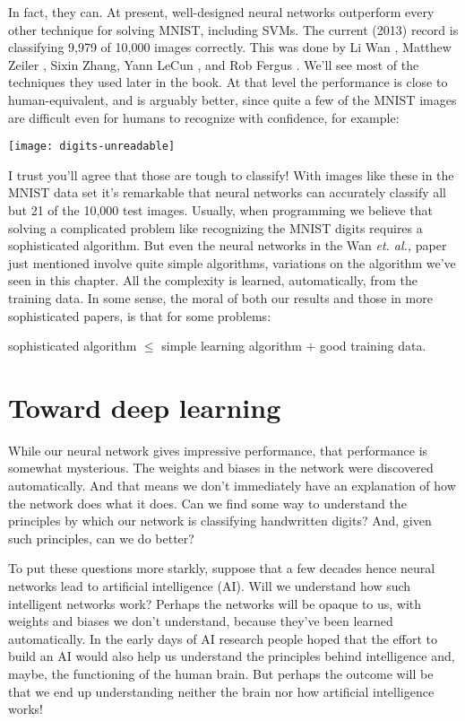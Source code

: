 In fact, they can. At present, well-designed neural networks outperform every other technique for solving MNIST, including SVMs. The current (2013) record is classifying 9,979 of 10,000 images correctly. This was done by Li Wan \cite{wanli2019}, Matthew Zeiler \cite{matthewzeiler2019}, Sixin Zhang, Yann LeCun \cite{yannlecun2019}, and Rob Fergus \cite{RobFergus2019}. We'll see most of the techniques they used later in the book. At that level the performance is close to human-equivalent, and is arguably better, since quite a few of the MNIST images are difficult even for humans to recognize with confidence, for example:

\begin{marginfigure}
\texttt{[image: digits-unreadable]}
\end{marginfigure}

I trust you'll agree that those are tough to classify! With images like these in the MNIST data set it's remarkable that neural networks can accurately classify all but 21 of the 10,000 test images. Usually, when programming we believe that solving a complicated problem like recognizing the MNIST digits requires a sophisticated algorithm. But even the neural networks in the Wan \textit{et. al.,} paper just mentioned involve quite simple algorithms, variations on the algorithm we've seen in this chapter. All the complexity is learned, automatically, from the training data. In some sense, the moral of both our results and those in more sophisticated papers, is that for some problems: 

sophisticated algorithm $\leq$ simple learning algorithm $+$ good training data. 

\section{Toward deep learning}

While our neural network gives impressive performance, that performance is somewhat mysterious. The weights and biases in the network were discovered automatically. And that means we don't immediately have an explanation of how the network does what it does. Can we find some way to understand the principles by which our network is classifying handwritten digits? And, given such principles, can we do better?

To put these questions more starkly, suppose that a few decades hence neural networks lead to artificial intelligence (AI). Will we understand how such intelligent networks work? Perhaps the networks will be opaque to us, with weights and biases we don't understand, because they've been learned automatically. In the early days of AI research people hoped that the effort to build an AI would also help us understand the principles behind intelligence and, maybe, the functioning of the human brain. But perhaps the outcome will be that we end up understanding neither the brain nor how artificial intelligence works!

